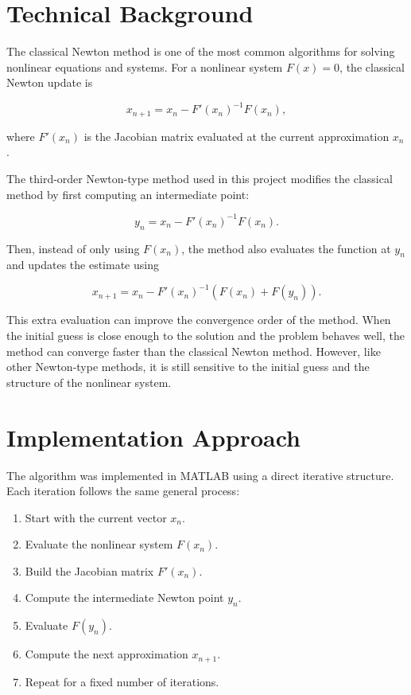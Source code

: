 \documentclass[11pt]{article}
\begin{document}
\section{Technical Background}

The classical Newton method is one of the most common algorithms for solving nonlinear equations and systems. For a nonlinear system $F(x)=0$, the classical Newton update is

\begin{equation}
    x_{n+1} = x_n - F'(x_n)^{-1}F(x_n),
\end{equation}

where $F'(x_n)$ is the Jacobian matrix evaluated at the current approximation $x_n$.

The third-order Newton-type method used in this project modifies the classical method by first computing an intermediate point:

\begin{equation}
    y_n = x_n - F'(x_n)^{-1}F(x_n).
\end{equation}

Then, instead of only using $F(x_n)$, the method also evaluates the function at $y_n$ and updates the estimate using

\begin{equation}
    x_{n+1} = x_n - F'(x_n)^{-1}\left(F(x_n) + F(y_n)\right).
\end{equation}

This extra evaluation can improve the convergence order of the method. When the initial guess is close enough to the solution and the problem behaves well, the method can converge faster than the classical Newton method. However, like other Newton-type methods, it is still sensitive to the initial guess and the structure of the nonlinear system.

\section{Implementation Approach}

The algorithm was implemented in MATLAB using a direct iterative structure. Each iteration follows the same general process:

\begin{enumerate}[leftmargin=*]
    \item Start with the current vector $x_n$.
    \item Evaluate the nonlinear system $F(x_n)$.
    \item Build the Jacobian matrix $F'(x_n)$.
    \item Compute the intermediate Newton point $y_n$.
    \item Evaluate $F(y_n)$.
    \item Compute the next approximation $x_{n+1}$.
    \item Repeat for a fixed number of iterations.
\end{enumerate}
\end{document}

